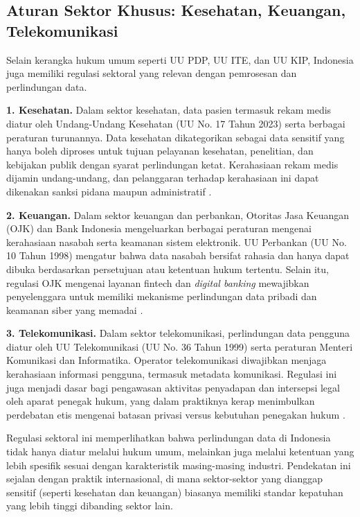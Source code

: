 \subsection{Aturan Sektor Khusus: Kesehatan, Keuangan, Telekomunikasi}

Selain kerangka hukum umum seperti UU PDP, UU ITE, dan UU KIP, Indonesia juga memiliki regulasi sektoral yang relevan dengan pemrosesan dan perlindungan data.

\textbf{1. Kesehatan.}  
Dalam sektor kesehatan, data pasien termasuk rekam medis diatur oleh Undang-Undang Kesehatan (UU No. 17 Tahun 2023) serta berbagai peraturan turunannya. Data kesehatan dikategorikan sebagai data sensitif yang hanya boleh diproses untuk tujuan pelayanan kesehatan, penelitian, dan kebijakan publik dengan syarat perlindungan ketat. Kerahasiaan rekam medis dijamin undang-undang, dan pelanggaran terhadap kerahasiaan ini dapat dikenakan sanksi pidana maupun administratif \cite{kesehatan2023}.  

\textbf{2. Keuangan.}  
Dalam sektor keuangan dan perbankan, Otoritas Jasa Keuangan (OJK) dan Bank Indonesia mengeluarkan berbagai peraturan mengenai kerahasiaan nasabah serta keamanan sistem elektronik. UU Perbankan (UU No. 10 Tahun 1998) mengatur bahwa data nasabah bersifat rahasia dan hanya dapat dibuka berdasarkan persetujuan atau ketentuan hukum tertentu. Selain itu, regulasi OJK mengenai layanan fintech dan \textit{digital banking} mewajibkan penyelenggara untuk memiliki mekanisme perlindungan data pribadi dan keamanan siber yang memadai \cite{ojk2017}.  

\textbf{3. Telekomunikasi.}  
Dalam sektor telekomunikasi, perlindungan data pengguna diatur oleh UU Telekomunikasi (UU No. 36 Tahun 1999) serta peraturan Menteri Komunikasi dan Informatika. Operator telekomunikasi diwajibkan menjaga kerahasiaan informasi pengguna, termasuk metadata komunikasi. Regulasi ini juga menjadi dasar bagi pengawasan aktivitas penyadapan dan intersepsi legal oleh aparat penegak hukum, yang dalam praktiknya kerap menimbulkan perdebatan etis mengenai batasan privasi versus kebutuhan penegakan hukum \cite{telekomunikasi1999}.  

Regulasi sektoral ini memperlihatkan bahwa perlindungan data di Indonesia tidak hanya diatur melalui hukum umum, melainkan juga melalui ketentuan yang lebih spesifik sesuai dengan karakteristik masing-masing industri. Pendekatan ini sejalan dengan praktik internasional, di mana sektor-sektor yang dianggap sensitif (seperti kesehatan dan keuangan) biasanya memiliki standar kepatuhan yang lebih tinggi dibanding sektor lain.

